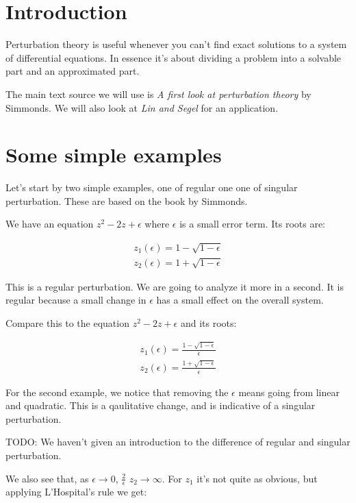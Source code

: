 \documentclass[12pt]{report}
\begin{document}
\section{Introduction}

Perturbation theory is useful whenever you can't find exact solutions
to a system of differential equations. In essence it's about dividing
a problem into a solvable part and an approximated part.

The main text source we will use is \textit{A first look at
  perturbation theory} by Simmonds. We will also look at \textit{Lin
  and Segel} for an application.

\section{Some simple examples}

Let's start by two simple examples, one of regular one one of singular
perturbation. These are based on the book by Simmonds.

We have an equation $z^2 - 2z + \epsilon$ where $\epsilon$ is a small
error term. Its roots are:

\begin{gather}
  z_1(\epsilon)=1 - \sqrt{1-\epsilon} \\
  z_2(\epsilon)=1 + \sqrt{1-\epsilon}
\end{gather}

This is a regular perturbation. We are going to analyze it more in a
second. It is regular because a small change in $\epsilon$ has a small
effect on the overall system.

Compare this to the equation $z^2 - 2z + \epsilon$ and its roots:

\begin{gather}
  z_1(\epsilon)=\frac{1 - \sqrt{1-\epsilon}}{\epsilon} \\
  z_2(\epsilon)=\frac{1 + \sqrt{1-\epsilon}}{\epsilon}
\end{gather}

For the second example, we notice that removing the $\epsilon$ means
going from linear and quadratic. This is a qaulitative change, and is
indicative of a singular perturbation.

TODO: We haven't given an introduction to the difference of regular
and singular perturbation.

We also see that, as $\epsilon \to 0$, $\frac{2}{\epsilon}$
$z_2 \rightarrow \infty$. For $z_1$ it's not quite as obvious, but
applying L'Hospital's rule we get:
\end{document}
